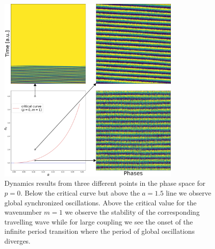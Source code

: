 \begin{figure}
  \centering
  \includegraphics[width=0.8\textwidth]{fig/chap4/crit_plane_sample.png}
	\caption{
		Dynamics results from three different points in the phase space for $p=0$. Below the critical curve but above the $a=1.5$ line we
		observe global synchronized oscillations. Above the critical value for the wavenumber $m=1$ we observe the stability of the
		corresponding travelling wave while for large coupling we see the onset of the infinite period transition where the period of
		global oscillations diverges.
  }
	\label{fig:critical_plane_sample}
\end{figure}


